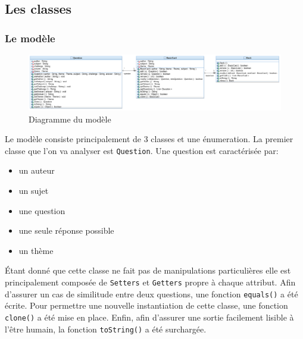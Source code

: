\newpage
\subsection{Les classes}

\subsubsection{Le modèle}
\begin{figure}[h]
	\centering
	\includegraphics[width=\textwidth]{ttmc_modele.png}
	\caption{Diagramme du modèle}
	\label{fig:diag_modele}
\end{figure}

Le modèle consiste principalement de 3 classes et une énumeration.
La premier classe que l'on va analyser est \verb|Question|.
Une question est caractérisée par:
\begin{itemize}
\item un auteur
\item un sujet
\item une question
\item une seule réponse possible
\item un thème
\end{itemize}

Étant donné que cette classe ne fait pas de manipulations particulières elle est principalement composée de \verb|Setters| et \verb|Getters| propre à chaque attribut.
Afin d'assurer un cas de similitude entre deux questions, une fonction \verb|equals()| a été écrite.
Pour permettre une nouvelle instantiation de cette classe, une fonction \verb|clone()| a été mise en place.
Enfin, afin d'assurer une sortie facilement lisible à l'être humain, la fonction \verb|toString()| a été surchargée.\\

